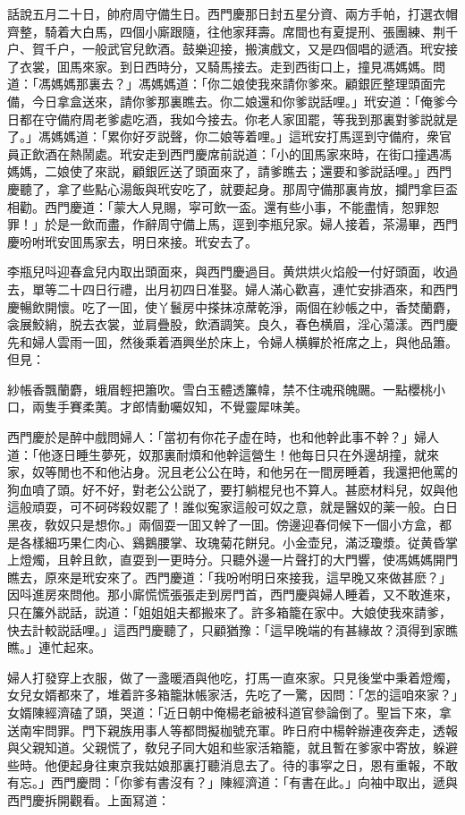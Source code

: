 話說五月二十日，帥府周守備生日。西門慶那日封五星分資、兩方手帕，打選衣帽齊整，騎着大白馬，四個小廝跟隨，往他家拜壽。席間也有夏提刑、張團練、荆千户、賀千户，一般武官兒飲酒。鼓樂迎接，搬演戲文，又是四個唱的遞酒。玳安接了衣裳，囬馬來家。到日西時分，又騎馬接去。走到西街口上，撞見馮媽媽。問道：「馮媽媽那裏去？」馮媽媽道：「你二娘使我來請你爹來。顧銀匠整理頭面完備，今日拿盒送來，請你爹那裏瞧去。你二娘還和你爹説話哩。」玳安道：「俺爹今日都在守備府周老爹處吃酒，我如今接去。你老人家囬罷，等我到那裏對爹説就是了。」馮媽媽道：「累你好歹説聲，你二娘等着哩。」這玳安打馬逕到守備府，衆官員正飲酒在熱鬧處。玳安走到西門慶席前説道：「小的囬馬家來時，在街口撞遇馮媽媽，二娘使了來説，顧銀匠送了頭面來了，請爹瞧去；還要和爹説話哩。」西門慶聽了，拿了些點心湯飯與玳安吃了，就要起身。那周守備那裏肯放，攔門拿巨盃相勸。西門慶道：「蒙大人見賜，寜可飲一盃。還有些小事，不能盡情，恕罪恕罪！」於是一飲而盡，作辭周守備上馬，逕到李瓶兒家。婦人接着，茶湯畢，西門慶吩咐玳安囬馬家去，明日來接。玳安去了。

李瓶兒呌迎春盒兒内取出頭面來，與西門慶過目。黄烘烘火焰般一付好頭面，收過去，單等二十四日行禮，出月初四日准娶。婦人滿心歡喜，連忙安排酒來，和西門慶暢飲開懷。吃了一囬，使丫鬟房中搽抹凉蓆乾淨，兩個在紗帳之中，香焚蘭麝，衾展鮫綃，脱去衣裳，並肩疊股，飲酒調笑。良久，春色横眉，淫心蕩漾。西門慶先和婦人雲雨一囬，然後乘着酒興坐於床上，令婦人横軃於袵席之上，與他品簫。但見：

紗帳香飄蘭麝，蛾眉輕把簫吹。雪白玉體透簾幃，禁不住魂飛魄颺。一點櫻桃小口，兩隻手賽柔荑。才郎情動囑奴知，不覺靈犀味美。

西門慶於是醉中戲問婦人：「當初有你花子虚在時，也和他幹此事不幹？」婦人道：「他逐日睡生夢死，奴那裏耐煩和他幹這營生！他每日只在外邊胡撞，就來家，奴等閒也不和他沾身。況且老公公在時，和他另在一間房睡着，我還把他罵的狗血噴了頭。好不好，對老公公説了，要打躺棍兒也不算人。甚麽材料兒，奴與他這般頑耍，可不砢硶殺奴罷了！誰似寃家這般可奴之意，就是醫奴的薬一般。白日黑夜，敎奴只是想你。」兩個耍一囬又幹了一囬。傍邊迎春伺候下一個小方盒，都是各樣細巧果仁肉心、鷄鵝腰掌、玫瑰菊花餅兒。小金壶兒，滿泛瓊漿。従黄昏掌上燈燭，且幹且飲，直耍到一更時分。只聽外邊一片聲打的大門響，使馮媽媽開門瞧去，原來是玳安來了。西門慶道：「我吩咐明日來接我，這早晚又來做甚麽？」因呌進房來問他。那小廝慌慌張張走到房門首，西門慶與婦人睡着，又不敢進來，只在簾外説話，説道：「姐姐姐夫都搬來了。許多箱籠在家中。大娘使我來請爹，快去計較説話哩。」這西門慶聽了，只顧猶豫：「這早晚端的有甚緣故？湏得到家瞧瞧。」連忙起來。

婦人打發穿上衣服，做了一盞暖酒與他吃，打馬一直來家。只見後堂中秉着燈燭，女兒女婿都來了，堆着許多箱籠牀帳家活，先吃了一驚，因問：「怎的這咱來家？」女婿陳經濟磕了頭，哭道：「近日朝中俺楊老爺被科道官參論倒了。聖旨下來，拿送南牢問罪。門下親族用事人等都問擬枷號充軍。昨日府中楊幹辦連夜奔走，透報與父親知道。父親慌了，敎兒子同大姐和些家活箱籠，就且暫在爹家中寄放，躲避些時。他便起身往東京我姑娘那裏打聽消息去了。待的事寜之日，恩有重報，不敢有忘。」西門慶問：「你爹有書沒有？」陳經濟道：「有書在此。」向袖中取出，遞與西門慶拆開觀看。上面冩道：

